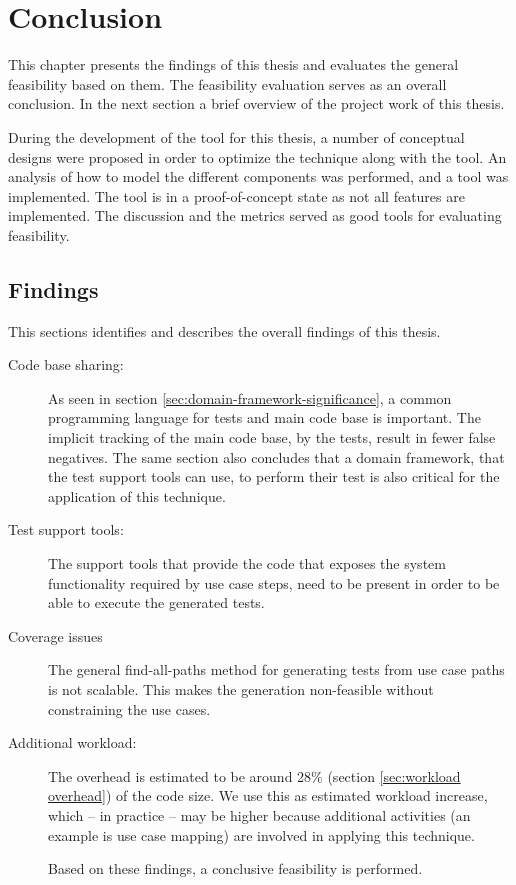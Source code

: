 \chapter{Conclusion}
This chapter presents the findings of this thesis and evaluates the general feasibility based on them. The feasibility evaluation serves as an overall conclusion. In the next section a brief overview of the project work of this thesis.\medskip

\noindent During the development of the tool for this thesis, a number of conceptual designs were proposed in order to optimize the technique along with the tool. An analysis of how to model the different components was performed, and a tool was implemented. The tool is in a proof-of-concept state as not all features are implemented. The discussion and the metrics served as good tools for evaluating feasibility.

\section{Findings}
This sections identifies and describes the overall findings of this thesis.

\begin{description}

  \item[Code base sharing:] As seen in section \ref{sec:domain-framework-significance}, a common programming language for tests and main code base is important. The implicit tracking of the main code base, by the tests, result in fewer false negatives. The same section also concludes that a domain framework, that the test support tools can use, to perform their test is also critical for the application of this technique.

  \item[Test support tools:] The support tools that provide the code that exposes the system functionality required by use case steps, need to be present in order to be able to execute the generated tests.

  \item[Coverage issues] The general find-all-paths method for generating tests from use case paths is not scalable. This makes the generation non-feasible without constraining the use cases.

  \item[Additional workload:] The overhead is estimated to be around 28\% (section \ref{sec:workload overhead}) of the code size. We use this as estimated workload increase, which -- in practice -- may be higher because additional activities (an example is use case mapping) are involved in applying this technique.

Based on these findings, a conclusive feasibility is performed.
\end{description}

